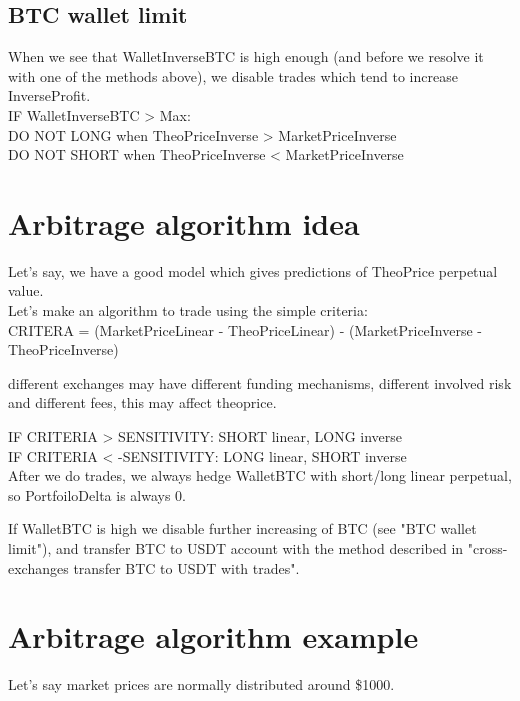 \documentclass{article}
\begin{document}
\subsection{BTC wallet limit}

When we see that WalletInverseBTC is high enough (and before we resolve it with one of the methods above), we disable trades which tend to increase InverseProfit. \\

IF WalletInverseBTC > Max: \\
DO NOT LONG when TheoPriceInverse > MarketPriceInverse \\
DO NOT SHORT when TheoPriceInverse < MarketPriceInverse \\






\section{Arbitrage algorithm idea}

Let's say, we have a good model which gives predictions of TheoPrice perpetual value. \\

Let's make an algorithm to trade using the simple criteria: \\

CRITERA = (MarketPriceLinear - TheoPriceLinear) - (MarketPriceInverse - TheoPriceInverse)

\danger different exchanges may have different funding mechanisms, different involved risk and different fees, this may affect theoprice.

IF CRITERIA > SENSITIVITY: SHORT linear, LONG inverse \\
IF CRITERIA < -SENSITIVITY: LONG linear, SHORT inverse \\

After we do trades, we always hedge WalletBTC with short/long linear perpetual, so PortfoiloDelta is always 0.

If WalletBTC is high we disable further increasing of BTC (see "BTC wallet limit"), and transfer BTC to USDT account with the method described in "cross-exchanges transfer BTC to USDT with trades".

\section{Arbitrage algorithm example}

Let's say market prices are normally distributed around \$1000.
\end{document}
